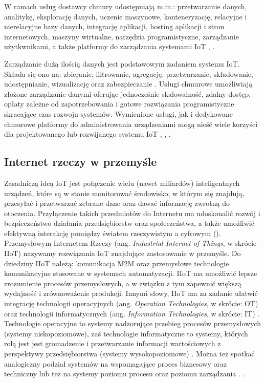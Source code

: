 \documentclass[a4paper, 12pt, twoside]{article}
\begin{document}
W ramach usług dostawcy chmury udostępniają m.in.: przetwarzanie danych, 
analitykę, eksplorację danych, uczenie maszynowe, konteneryzację, relacyjne i nierelacyjne
bazy danych, integrację aplikacji, hosting aplikacji i stron internetowych, 
maszyny wirtualne, narzędzia programistyczne, zarządzanie użytkwnikami, a także
platformy do zarządzania systemami IoT \cite{aws}, \cite{azure}.

Zarządzanie dużą ilością danych jest podstawowym zadaniem systemu IoT. Składa się ono
na: zbieranie, filtrowanie, agregację, przetwarzanie, składowanie, udostępnianie,
wizualizację oraz zabezpieczanie \cite{intro-to-iot}. Usługi chmurowe umożliwiają złożone zarządzanie
danymi oferując jednocześnie skalowalność, zdalny dostęp, opłaty zależne od zapotrzebowania
i gotowe rozwiązania programistyczne skracające czas rozwoju systemów. 
Wymienione usługi, jak i dedykowane chmurowe platformy do administrowania 
urządzeniami mogą nieść wiele korzyści dla projektowanego lub rozwijanego
systemu IoT \cite{measuring-value-of-cloud-computing}, \cite{iot-and-cloud}, \cite{iot-in-industrial-sector}. 

\subsection{Internet rzeczy w przemyśle}\label{iiot}

Zasadniczą ideą IoT jest połączenie wielu (nawet miliardów) inteligentnych urządzeń,
które są w stanie monitorować środowisko, w którym się znajdują, przesyłać 
i przetwarzać zebrane dane oraz dawać informację zwrotną do otoczenia. Przyłączenie
takich przedmiotów do Internetu ma udoskonalić rozwój i bezpieczeństwo
działania przedsiębiorstw oraz społeczeństwa, a także umożliwić efektywną
interakcję pomiędzy światem rzeczywistym a cyfrowym (). 
Przemysłowym Internetem Rzeczy (ang. \emph{Industrial Internet of Things}, w skrócie IIoT)
nazywamy rozwiązania IoT znajdujące zastosowanie w przemyśle. Do dziedziny
IIoT należą: komunikacja M2M oraz przemysłowe technologie komunikacyjne stosowane 
w systemach automatyzacji. IIoT ma umożliwić lepsze zrozumienie procesów
przemysłowych, a w związku z tym zapewnić większą wydajność i zrównoważenie
produkcji. Innymi słowy, IIoT ma za zadanie ułatwić integrację technologii operacyjnych 
(ang. \emph{Operation Technologies}, w skrócie: OT) oraz
technologii informatycznych (ang. \emph{Information Technologies}, w skrócie: IT) 
\cite{iiot-challenges-opportunities-directions}.
Technologie operacyjne to systemy nadzorujące przebieg procesów przemysłowych (systemy niskopoziomowe), 
zaś technologie informatyczne to systemy, których rolą jest jest gromadzenie 
i przetwarzanie informacji wartościowych z perspektywy przedsiębiorstwa (systemy wysokopoziomowe)
\cite{ot-it-categorization-of-customer-concerns}.
Można też spotkać analogiczny podział systemów na wspomagające proces biznesowy 
oraz techniczny lub też na systemy poziomu procesu oraz poziomu zarządzania \cite{isp}.
.
\end{document}
